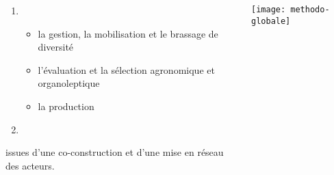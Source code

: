 \begin{frame}

\begin{columns}

\begin{column}{.4\textwidth}
\begin{enumerate}

\item {}

\begin{itemize}
\item la gestion, la mobilisation et le brassage de diversité
\item l'évaluation et la sélection agronomique et organoleptique
\item la production
\end{itemize}

\item {}
\end{enumerate}

issues d'une co-construction et d'une mise en réseau des acteurs.


\end{column}

\begin{column}{.6\textwidth}
\texttt{[image: methodo-globale]} \tiny \cite{methodo-globale}
\end{column}

\end{columns}


\end{frame}



